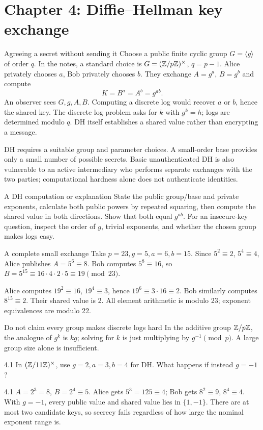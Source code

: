 \documentclass[11pt,a4paper]{article}
\begin{document}
\section{Chapter 4: Diffie--Hellman key exchange}
\begin{concept}{Agreeing a secret without sending it}
Choose a public finite cyclic group \(G=\langle g\rangle\) of order \(q\). In the notes, a standard choice is \(G=(\mathbb Z/p\mathbb Z)^\times\), \(q=p-1\). Alice privately chooses \(a\), Bob privately chooses \(b\). They exchange \(A=g^a\), \(B=g^b\) and compute
\[K=B^a=A^b=g^{ab}.\]
An observer sees \(G,g,A,B\). Computing a discrete log would recover \(a\) or \(b\), hence the shared key. The discrete log problem asks for \(k\) with \(g^k=h\); logs are determined modulo \(q\). DH itself establishes a shared value rather than encrypting a message.

DH requires a suitable group and parameter choices. A small-order base provides only a small number of possible secrets. Basic unauthenticated DH is also vulnerable to an active intermediary who performs separate exchanges with the two parties; computational hardness alone does not authenticate identities.
\end{concept}
\begin{method}{A DH computation or explanation}
State the public group/base and private exponents, calculate both public powers by repeated squaring, then compute the shared value in both directions. Show that both equal \(g^{ab}\). For an insecure-key question, inspect the order of \(g\), trivial exponents, and whether the chosen group makes logs easy.
\end{method}
\begin{example}{A complete small exchange}
Take \(p=23,g=5,a=6,b=15\). Since \(5^2\equiv2\), \(5^4\equiv4\), Alice publishes \(A=5^6\equiv8\). Bob computes \(5^8\equiv16\), so \(B=5^{15}\equiv16\cdot4\cdot2\cdot5\equiv19\pmod{23}\).

Alice computes \(19^2\equiv16\), \(19^4\equiv3\), hence \(19^6\equiv3\cdot16\equiv2\). Bob similarly computes \(8^{15}\equiv2\). Their shared value is 2. All element arithmetic is modulo 23; exponent equivalences are modulo 22.
\end{example}
\begin{tip}{Do not claim every group makes discrete logs hard}
In the additive group \(\mathbb Z/p\mathbb Z\), the analogue of \(g^k\) is \(kg\); solving for \(k\) is just multiplying by \(g^{-1}\pmod p\). A large group size alone is insufficient.
\end{tip}
\begin{question}{4.1}
In \((\mathbb Z/11\mathbb Z)^\times\), use \(g=2,a=3,b=4\) for DH. What happens if instead \(g=-1\)?
\end{question}
\begin{answer}{4.1}
\(A=2^3=8\), \(B=2^4\equiv5\). Alice gets \(5^3=125\equiv4\); Bob gets \(8^2\equiv9\), \(8^4\equiv4\). With \(g=-1\), every public value and shared value lies in \(\{1,-1\}\). There are at most two candidate keys, so secrecy fails regardless of how large the nominal exponent range is.
\end{answer}
\end{document}

